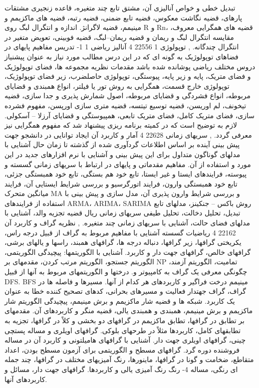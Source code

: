 \documentclass[class=article, crop=false]{standalone}
\begin{document}
{{{{        }}{{
            تبدیل خطی و خواص آنالیزی آن، مشتق تابع چند متغیره، قاعده زنجیری مشتقات پارهای، قضیه نگاشت معکوس، قضیه تابع ضمنی، قضیه رتبه، قضیه های ماکزیمم و مینیمم، قضیه لاگرانژ. اندازه و انتگرال لبگ روی R و Rn، قضیه های همگرایی معروف، مقایسه انتگرال لبگ و ریمان و قضیه ریمان–لبگ، قضیه فوبینی، تعویض متغیر در انتگرال چندگانه.
        }}
        },{{
            توپولوژی 1
        }{
            22556
        }{
            4
        }{
            آنالیز ریاضی 1
        }{{
            1- تدریس مفاهیم پایهای در فضاهای توپولوژیک به گونه ای که در این درس مطالب مورد نیاز به عنوان پیشنیاز دروس مختلف ریاضی پوشانده شده باشد
        }}{{
            مقدمات نظریه مجموعه ها، فضای توپولوژیک و فضای متریک، پایه و زیر پایه، پیوستگی، توپولوژی حاصلضرب، زیر فضای توپولوژیک، توپولوژی خارج قسمت، همگرایی به روش تور یا فیلتر، انواع همبندی و قضایای مربوطه، انواع فشردگی و قضایای مربوطه، اصول شمارش پذیری و جدا سازی، قضیه تیخونف، لم اوریسن، قضیه توسیع تیتسه، قضیه متری سازی اورپسن، مفهوم فشرده سازی، فضای متریک کامل، فضای متریک تابعی، همپیوستگی و قضایای آرزلا – آسکولی. لازم به توضیح است که در کمیته برنامه ریزی پیشنهاد شد که مفهوم همگرایی نیز معرفی گردد.
        }}
        },{{
            سریهای زمانی
        }{
            22628
        }{
            4
        }{
            آمار و کاربرد آن
        }{{
            ایجاد توانایی در دانشجو جهت پیش بینی آینده بر اساس اطلاعات گردآوری شده از گذشته تا زمان حال آشنایی با مدلهای گوناگون متداول برای این پیش بینی و آشنایی با نرم افزارهای جدید در این مورد و استفاده از آن.
        }}{{
            مفاهیم مقدماتی و پایهای در ارتباط با سریهای زمانی گسسته و پیوسته، فرایندهای ایستا و غیر ایستا، تابع خود هم بستگی، تابع خود همبستگی جزئی، تابع خود همبستگی وارون، فرایند اتورگرسیو و بررسی شرایط ایستایی آن، فرایند میانگین متحرک MA و بررسی شرایط وارون پذیری آن، مدل سازی و پیش بینی با استفاده از فرایندهای ARMA، ARIMA، SARIMA روش باکس – جنکینز، مدلهای تابع تبدیل، تحلیل دخالت، تحلیل طیفی سریهای زمانی ریال قضیه تجزیه والد، آشنایی با مدلهای فضای حالت، آشنایی با سریهای زمانی چند متغیره.
        }}
        },{{
            نظریه گراف و کاربرد آن
        }{
            22162
        }{
            4
        }{
            ریاضیات گسسته
        }{}{{
            آشنایی با مفاهیم مربوط به گراف از قبیل درجه راس، یکریختی گرافها، زیر گرافها، دنباله درجه ها، گرافهای همبند، راسها و یالهای برشی، گرافهای خالص، گرافهای جهت دار و کاربرد. آشنایی با الگوریتمها: پیچیدگی الگوریتمی، الگوریتم جستجو، الگوریتم مرتب کردن، مقدمهای بر NP تمامیت، الگوریتم آزمند، چگونگی معرفی یک گراف به کامپیوتر و. درختها و الگوریتمهای مربوط به آنها از قبیل DFS. BFS مینیمم درخت فراگیر و کاربردهای هر کدام از آنها. مسیرها و فاصله ها در گراف، گراف جهتدار فعالیت و مسیرهای بحرانی، کدهای تصحیح کننده خطا به عنوان یک کاربرد. شبکه ها و قضیه شار ماکزیمم و برش مینیمم، پیچیدگی الگوریتم شار ماکزیمم و برش مینیمم، همبندی و همبندی یالی، قضیه منگر و کاربردهای آن. مقدمهای بر تطابق در گرافها، تطابق ماکزیمم در گرافهای دو بخشی و کلاً در گرافها، تجزیه به تطابقهای کامل، کاربردها مثلاً در طرحهای بلوکی. گرافهای اویلری و مساله پستچی چینی، گرافهای اویلری جهت دار. آشنایی با گرافهای هامیلتونی و کاربرد آن در مساله فروشنده دوره گرد. گرافهای مسطح و الگوریتمی برای آزمون مسطح بودن، اعداد متقاطع، ضخامت و گونا در گرافها، ماینورها، رنگ آمیزیهای مختلف در گرافها، چند جمله ای رنگی، مساله 4- رنگ رنگ آمیزی یالی و کاربردها. گرافهای جهت دار، مسائل و کاربردهای آنها.
}}}}
\end{document}
